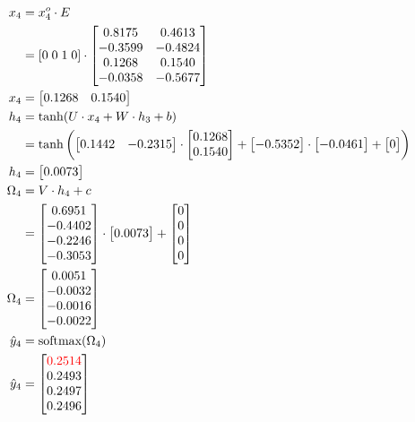 \documentclass{article}
\begin{document}
\begin{align*}
    x_4 & = x^o_4 \cdot E \\
    & =  [0 \; 0\; 1\; 0] \cdot \begin{bmatrix}
  0.8175 & 0.4613 \\
 -0.3599 & -0.4824 \\
  0.1268 & 0.1540 \\
 -0.0358 & -0.5677
\end{bmatrix} \\
    x_4 & = \begin{bmatrix}
  0.1268 & 0.1540
\end{bmatrix} \\
    h_4 & = \tanh(U \cdot x_4 + W \cdot h_3 + b) \\
    & = \tanh\left(\begin{bmatrix}
  0.1442 & -0.2315
\end{bmatrix} \cdot \begin{bmatrix}
 0.1268 \\ 0.1540
\end{bmatrix} + \begin{bmatrix}
 -0.5352
\end{bmatrix} \cdot \begin{bmatrix} -0.0461 \end{bmatrix} + \begin{bmatrix} 0 \end{bmatrix}\right) \\
    h_4 & = \begin{bmatrix} 0.0073 \end{bmatrix} \\
    \Omega_4 & = V \cdot h_4 + c \\
    & = \begin{bmatrix}
  0.6951 \\
 -0.4402 \\
 -0.2246 \\
 -0.3053
\end{bmatrix} \cdot \begin{bmatrix}  0.0073 \end{bmatrix} + \begin{bmatrix} 0 \\ 0 \\ 0 \\ 0 \end{bmatrix} \\
    \Omega_4 & = \begin{bmatrix}
   0.0051\\
 -0.0032\\
 -0.0016\\
 -0.0022 \\
\end{bmatrix} \\
    \hat{y}_4 & = \text{softmax}(\Omega_4) \\
    \hat{y}_4 & = \begin{bmatrix}
  \textcolor{red}{0.2514} \\
 0.2493 \\
 0.2497 \\
 0.2496 \\
\end{bmatrix}
\end{align*}
\end{document}
